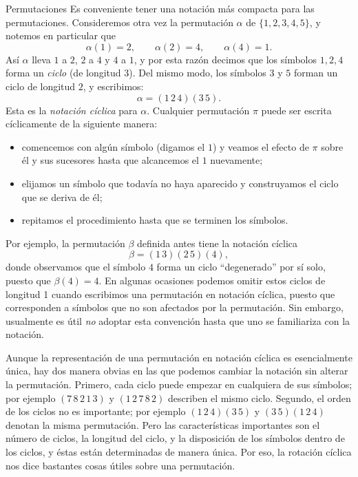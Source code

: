 \begin{section}{Permutaciones}
Es conveniente tener una notación más compacta para las permutaciones. Consideremos otra vez la permutación $\alpha$ de $\{1,2,3,4,5\}$, y notemos en particular que
$$
\alpha(1)=2,\qquad \alpha(2)=4,\qquad \alpha(4)=1.
$$
Así $\alpha$ lleva $1$ a $2$, $2$ a $4$ y $4$ a $1$, y por esta razón decimos que los símbolos $1, 2, 4$ forma un \textit{ciclo } (de longitud $3$). Del mismo modo, los símbolos $3$ y $5$ forman un ciclo de longitud $2$, y
escribimos:
$$
\alpha=(1\,2\,4)(3\,5).
$$
Esta es la \textit{notación cíclica} para $\alpha$. Cualquier  permutación $\pi$ puede ser escrita cíclicamente de la siguiente manera:
\begin{itemize}
\item comencemos con algún símbolo (digamos el $1$) y veamos el efecto de $\pi$ sobre él y sus sucesores hasta que alcancemos el $1$
nuevamente;
\item elijamos un símbolo que todavía no haya aparecido y construyamos el ciclo que se deriva de él; 
\item repitamos el procedimiento hasta que se terminen los símbolos.
\end{itemize}
Por ejemplo, la permutación $\beta$ definida antes tiene la notación cíclica
$$
\beta=(1\,3)(2\,5)(4),
$$
donde observamos que el símbolo $4$ forma un ciclo ``degenerado'' por sí solo, puesto que $\beta(4)=4$. En algunas ocasiones podemos omitir estos ciclos de longitud 1 cuando escribimos una permutación en notación cíclica, puesto que corresponden a símbolos que no son afectados por la permutación. Sin embargo, usualmente es útil \textit{no} adoptar esta convención hasta que uno se familiariza con la notación.


Aunque la representación de una permutación en notación cíclica es esencialmente única, hay dos manera obvias en las que podemos cambiar la notación sin alterar la permutación. Primero, cada ciclo puede empezar en cualquiera de sus símbolos; por ejemplo $(7\,8\,2\,1\,3)$ y $(1\,2\,7\,8\,2)$ describen el mismo ciclo. Segundo, el orden de los ciclos no es importante; por ejemplo $(1\,2\,4) (3\,5)$ y $(3\,5) (1\,2\,4)$ denotan la misma permutación. Pero las características importantes son el número de ciclos, la longitud del ciclo, y la disposición de los símbolos dentro de los ciclos, y éstas están determinadas de manera única. Por eso, la rotación cíclica nos dice bastantes cosas útiles sobre una permutación.


\end{section}
